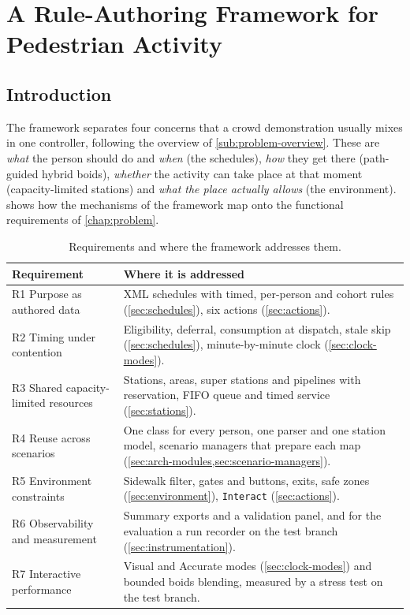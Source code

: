 \chapter{A Rule-Authoring Framework for Pedestrian Activity}\label{chap:contribution}
\begingroup\sloppy

\section{Introduction}\label{sec:contrib-intro}

The framework separates four concerns that a crowd demonstration usually mixes in one controller, following the overview of \cref{sub:problem-overview}. These are \emph{what} the person should do and \emph{when} (the schedules), \emph{how} they get there (path-guided hybrid boids), \emph{whether} the activity can take place at that moment (capacity-limited stations) and \emph{what the place actually allows} (the environment).  shows how the mechanisms of the framework map onto the functional requirements of \cref{chap:problem}.

\begin{table}[H]
\centering
\small\renewcommand{\arraystretch}{1.15}
\begin{tabularx}{\textwidth}{|L{4.3cm}|>{\raggedright\arraybackslash}X|}
\hline
{}\textbf{Requirement} & \textbf{Where it is addressed} \\
\hline
R1 Purpose as authored data & XML schedules with timed, per-person and cohort rules (\cref{sec:schedules}), six actions (\cref{sec:actions}). \\ \hline
R2 Timing under contention & Eligibility, deferral, consumption at dispatch, stale skip (\cref{sec:schedules}), minute-by-minute clock (\cref{sec:clock-modes}). \\ \hline
R3 Shared capacity-limited resources & Stations, areas, super stations and pipelines with reservation, FIFO queue and timed service (\cref{sec:stations}). \\ \hline
R4 Reuse across scenarios & One class for every person, one parser and one station model, scenario managers that prepare each map (\cref{sec:arch-modules,sec:scenario-managers}). \\ \hline
R5 Environment constraints & Sidewalk filter, gates and buttons, exits, safe zones (\cref{sec:environment}), \texttt{Interact} (\cref{sec:actions}). \\ \hline
R6 Observability and measurement & Summary exports and a validation panel, and for the evaluation a run recorder on the test branch (\cref{sec:instrumentation}). \\ \hline
R7 Interactive performance & Visual and Accurate modes (\cref{sec:clock-modes}) and bounded boids blending, measured by a stress test on the test branch. \\ \hline
\end{tabularx}
\caption[Requirements and where they are addressed]{Requirements and where the framework addresses them.}
\label{tab:requirements-map}
\end{table}

